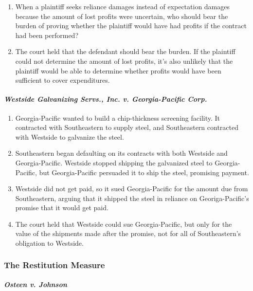 \begin{enumerate}
    \item When a plaintiff seeks reliance damages instead of expectation 
    damages because the amount of lost profits were uncertain, who should bear 
    the burden of proving whether the plaintiff would have had profits if the 
    contract had been performed?
    \item The court held that the defendant should bear the burden. If the 
    plaintiff could not determine the amount of lost profits, it's also 
    unlikely that the plaintiff would be able to determine whether profits 
    would have been sufficient to cover expenditures.
\end{enumerate}

\paragraph{\emph{Westside Galvanizing Servs., Inc. v. Georgia-Pacific Corp.}}

\begin{enumerate}
    \item Georgia-Pacific wanted to build a chip-thickness screening facility. 
    It contracted with Southeastern to supply steel, and Southeastern 
    contracted with Westside to galvanize the steel.
    \item Southeastern began defaulting on its contracts with both Westside 
    and Georgia-Pacific. Westside stopped shipping the galvanized steel to 
    Georgia-Pacific, but Georgia-Pacific persuaded it to ship the steel, 
    promising payment.
    \item Westside did not get paid, so it sued Georgia-Pacific for the amount 
    due from Southeastern, arguing that it shipped the steel in reliance on 
    Georiga-Pacific's promise that it would get paid.
    \item The court held that Westside could sue Georgia-Pacific, but only for 
    the value of the shipments made after the promise, not for all of 
    Southeastern's obligation to Westside.
\end{enumerate}

\subsubsection{The Restitution Measure}

\paragraph{\emph{Osteen v. Johnson}}

